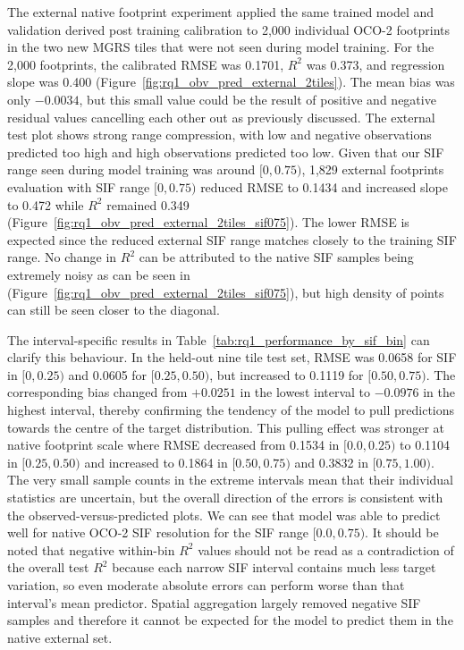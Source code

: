 The external native footprint experiment applied the same trained model and validation derived post training calibration to 2,000 individual OCO-2 footprints in the two new MGRS tiles that were not seen during model training. For the 2,000 footprints, the calibrated RMSE was 0.1701, $R^2$ was 0.373, and regression slope was 0.400 (Figure~\ref{fig:rq1_obv_pred_external_2tiles}). The mean bias was only $-0.0034$, but this small value could be the result of positive and negative residual values cancelling each other out as previously discussed. The external test plot shows strong range compression, with low and negative observations predicted too high and high observations predicted too low. Given that our SIF range seen during model training was around $[0,0.75)$, 1,829 external footprints evaluation with SIF range $[0,0.75)$ reduced RMSE to 0.1434 and increased slope to 0.472 while $R^2$ remained 0.349
(Figure~\ref{fig:rq1_obv_pred_external_2tiles_sif075}). The lower RMSE is expected since the reduced external SIF range matches closely to the training SIF range. No change in $R^2$ can be attributed to the native SIF samples being extremely noisy as can be seen in (Figure~\ref{fig:rq1_obv_pred_external_2tiles_sif075}), but high density of points can still be seen closer to the diagonal. 

The interval-specific results in Table~\ref{tab:rq1_performance_by_sif_bin} can clarify this behaviour. In the held-out nine tile test set, RMSE was 0.0658 for SIF in $[0,0.25)$ and 0.0605 for $[0.25,0.50)$, but increased to 0.1119 for $[0.50,0.75)$. The corresponding bias changed from $+0.0251$ in the lowest interval to $-0.0976$ in the highest interval, thereby confirming the tendency of the model to pull predictions towards the centre of the target distribution. This pulling effect was stronger at native footprint scale where RMSE decreased from 0.1534 in $[0.0,0.25)$ to 0.1104 in $[0.25,0.50)$  and increased to 0.1864 in $[0.50,0.75)$ and 0.3832 in $[0.75,1.00)$. The very small sample counts in the extreme intervals mean that their individual statistics are uncertain, but the overall direction of the errors is consistent with the observed-versus-predicted plots. We can see that model was able to predict well for native OCO-2 SIF resolution for the SIF range $[0.0,0.75)$. It should be noted that negative within-bin $R^2$ values should not be read as a contradiction of the overall test $R^2$ because each narrow SIF interval contains much less target variation, so even moderate absolute errors can perform worse than that interval's mean predictor. Spatial aggregation largely removed negative SIF samples and therefore it cannot be expected for the model to predict them in the native external set. 

